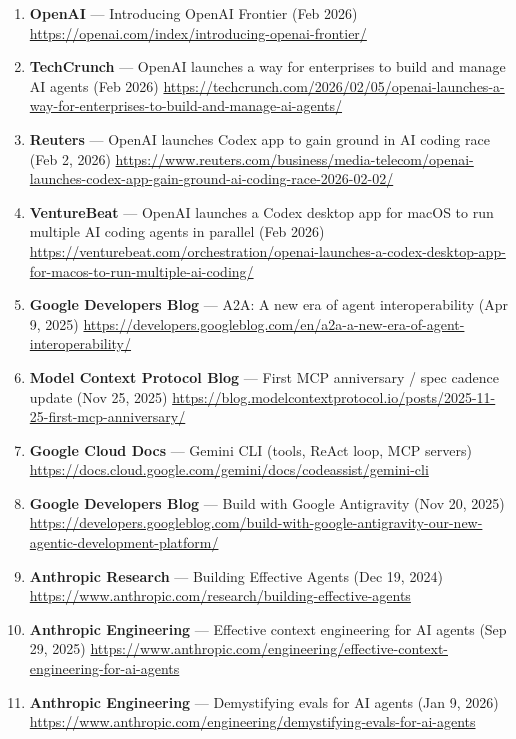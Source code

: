 \documentclass[
]{article}
\providecommand{\tightlist}{%
  \setlength{\itemsep}{0pt}\setlength{\parskip}{0pt}}
\begin{document}
\begin{enumerate}
\def\labelenumi{\arabic{enumi}.}
\tightlist
\item
  \textbf{OpenAI} --- Introducing OpenAI Frontier (Feb 2026)
  \url{https://openai.com/index/introducing-openai-frontier/}
\item
  \textbf{TechCrunch} --- OpenAI launches a way for enterprises to build
  and manage AI agents (Feb 2026)
  \url{https://techcrunch.com/2026/02/05/openai-launches-a-way-for-enterprises-to-build-and-manage-ai-agents/}
\item
  \textbf{Reuters} --- OpenAI launches Codex app to gain ground in AI
  coding race (Feb 2, 2026)
  \url{https://www.reuters.com/business/media-telecom/openai-launches-codex-app-gain-ground-ai-coding-race-2026-02-02/}
\item
  \textbf{VentureBeat} --- OpenAI launches a Codex desktop app for macOS
  to run multiple AI coding agents in parallel (Feb 2026)
  \url{https://venturebeat.com/orchestration/openai-launches-a-codex-desktop-app-for-macos-to-run-multiple-ai-coding/}
\item
  \textbf{Google Developers Blog} --- A2A: A new era of agent
  interoperability (Apr 9, 2025)
  \url{https://developers.googleblog.com/en/a2a-a-new-era-of-agent-interoperability/}
\item
  \textbf{Model Context Protocol Blog} --- First MCP anniversary / spec
  cadence update (Nov 25, 2025)
  \url{https://blog.modelcontextprotocol.io/posts/2025-11-25-first-mcp-anniversary/}
\item
  \textbf{Google Cloud Docs} --- Gemini CLI (tools, ReAct loop, MCP
  servers)
  \url{https://docs.cloud.google.com/gemini/docs/codeassist/gemini-cli}
\item
  \textbf{Google Developers Blog} --- Build with Google Antigravity (Nov
  20, 2025)
  \url{https://developers.googleblog.com/build-with-google-antigravity-our-new-agentic-development-platform/}
\item
  \textbf{Anthropic Research} --- Building Effective Agents (Dec 19,
  2024)
  \url{https://www.anthropic.com/research/building-effective-agents}
\item
  \textbf{Anthropic Engineering} --- Effective context engineering for
  AI agents (Sep 29, 2025)
  \url{https://www.anthropic.com/engineering/effective-context-engineering-for-ai-agents}
\item
  \textbf{Anthropic Engineering} --- Demystifying evals for AI agents
  (Jan 9, 2026)
  \url{https://www.anthropic.com/engineering/demystifying-evals-for-ai-agents}

\end{enumerate}
\end{document}
